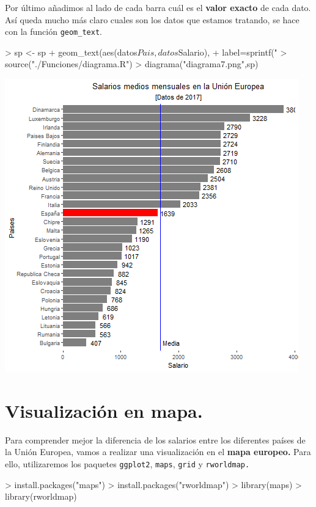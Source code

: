 \documentclass [a4paper] {article}
\begin{document}
\bigskip
Por último añadimos al lado de cada barra cuál es el \textbf{valor exacto} de cada dato. Así queda mucho más claro cuales
son los datos que estamos tratando, se hace con la función \texttt{geom\_text}.
\begin{Schunk}
\begin{Sinput}
> sp <- sp + geom_text(aes(datos$Pais,datos$Salario),
+         label=sprintf("           %
> source("./Funciones/diagrama.R")
> diagrama("diagrama7.png",sp)
\end{Sinput}
\end{Schunk}

\includegraphics[width=\textwidth]{diagrama7}

\section{Visualización en mapa.}
\bigskip
Para comprender mejor la diferencia de los salarios entre los diferentes países de la Unión Europea, vamos a 
realizar una visualización en el \textbf{mapa europeo.} Para ello, utilizaremos los paquetes \texttt{ggplot2}, 
\texttt{maps}, \texttt{grid} y \texttt{rworldmap.}
\begin{Schunk}
\begin{Sinput}
> install.packages("maps")
> install.packages("rworldmap")
> library(maps)
> library(rworldmap)
\end{Sinput}
\end{Schunk}
\end{document}
